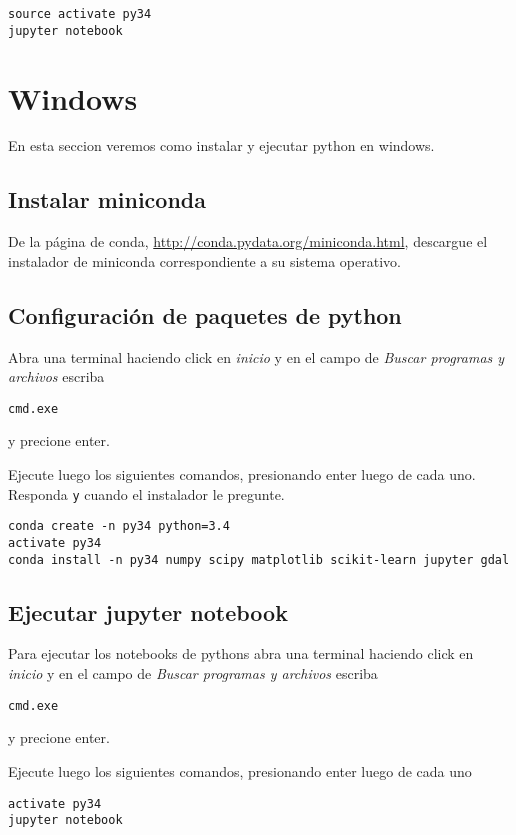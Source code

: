 \documentclass[hidelinks,12pt]{article}
\begin{document}
\begin{verbatim}
source activate py34
jupyter notebook
\end{verbatim}

\section{Windows}
En esta seccion veremos como instalar y ejecutar python en windows.

\subsection{Instalar miniconda}

De la p\'agina de conda, \url{http://conda.pydata.org/miniconda.html}, descargue 
el instalador de miniconda correspondiente a su sistema operativo. 

\subsection{Configuraci\'on de paquetes de python}

Abra una terminal haciendo click en \emph{inicio} y en el campo de \emph{Buscar
programas y archivos} escriba 
\begin{verbatim}
cmd.exe
\end{verbatim}
y precione enter.

Ejecute luego los siguientes comandos, presionando enter luego de cada uno. Responda 
\texttt{y} cuando el instalador le pregunte.

\begin{verbatim}
conda create -n py34 python=3.4
activate py34
conda install -n py34 numpy scipy matplotlib scikit-learn jupyter gdal
\end{verbatim}

\subsection{Ejecutar jupyter notebook}
Para ejecutar los notebooks de pythons abra una terminal haciendo click en 
\emph{inicio} y en el campo de \emph{Buscar programas y archivos} escriba 
\begin{verbatim}
cmd.exe
\end{verbatim}
y precione enter.

Ejecute luego los siguientes comandos, presionando enter luego de cada uno

\begin{verbatim}
activate py34
jupyter notebook
\end{verbatim}


\end{document}
